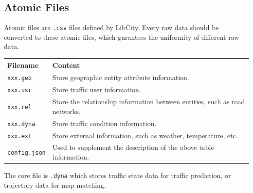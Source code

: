 \documentclass[fontset=none]{ctexart}
\theoremstyle{definition}
\theoremstyle{remark}
\begin{document}
\subsection{Atomic Files}
Atomic files are \texttt{.csv} files defined by LibCity. Every raw data should be converted to these atomic files,
which gurantees the uniformity of different raw data.

\begin{table}[!ht]
  \centering
  \begin{tabular}{|l|l|}
  \hline
      \textbf{Filename} & \textbf{Content} \\ \hline
      \texttt{xxx.geo} & Store geographic entity attribute information. \\ \hline
      \texttt{xxx.usr} & Store traffic user information. \\ \hline
      \texttt{xxx.rel} & Store the relationship information between entities, such as road networks. \\ \hline
      \texttt{xxx.dyna} & Store traffic condition information. \\ \hline
      \texttt{xxx.ext} & Store external information, such as weather, temperature, etc. \\ \hline
      \texttt{config.json} & Used to supplement the description of the above table information. \\ \hline
  \end{tabular}
\end{table}

The core file is \texttt{.dyna} which stores traffic state data for traffic prediction, or
trajectory data for map matching.
\end{document}
